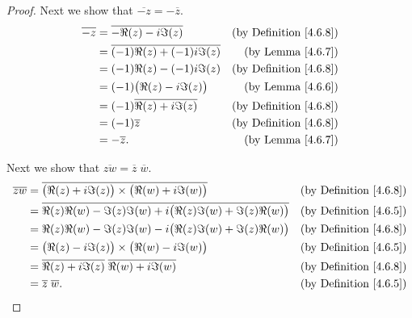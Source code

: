 \begin{proof}
    Next we show that \(\overline{-z} = -\overline{z}\).
    \begin{align*}
        \overline{-z} & = \overline{-\Re(z) - i \Im(z)}          & \text{(by Definition \ref{4.6.8})} \\
                      & = \overline{(-1) \Re(z) + (-1) i \Im(z)} & \text{(by Lemma \ref{4.6.7})}      \\
                      & = (-1) \Re(z) - (-1) i \Im(z)            & \text{(by Definition \ref{4.6.8})} \\
                      & = (-1) \big(\Re(z) - i \Im(z)\big)       & \text{(by Lemma \ref{4.6.6})}      \\
                      & = (-1) \overline{\Re(z) + i \Im(z)}      & \text{(by Definition \ref{4.6.8})} \\
                      & = (-1) \overline{z}                      & \text{(by Definition \ref{4.6.8})} \\
                      & = -\overline{z}.                         & \text{(by Lemma \ref{4.6.7})}
    \end{align*}

    Next we show that \(\overline{zw} = \overline{z} \; \overline{w}\).
    \begin{align*}
        \overline{zw} & = \overline{\big(\Re(z) + i \Im(z)\big) \times \big(\Re(w) + i \Im(w)\big)}            & \text{(by Definition \ref{4.6.8})} \\
                      & = \overline{\Re(z) \Re(w) - \Im(z) \Im(w) + i \big(\Re(z) \Im(w) + \Im(z) \Re(w)\big)} & \text{(by Definition \ref{4.6.5})} \\
                      & = \Re(z) \Re(w) - \Im(z) \Im(w) - i \big(\Re(z) \Im(w) + \Im(z) \Re(w)\big)            & \text{(by Definition \ref{4.6.8})} \\
                      & = \big(\Re(z) - i \Im(z)\big) \times \big(\Re(w) - i \Im(w)\big)                       & \text{(by Definition \ref{4.6.5})} \\
                      & = \overline{\Re(z) + i \Im(z)} \; \overline{\Re(w) + i \Im(w)}                         & \text{(by Definition \ref{4.6.8})} \\
                      & = \overline{z} \; \overline{w}.                                                        & \text{(by Definition \ref{4.6.5})}
    \end{align*}


\end{proof}

